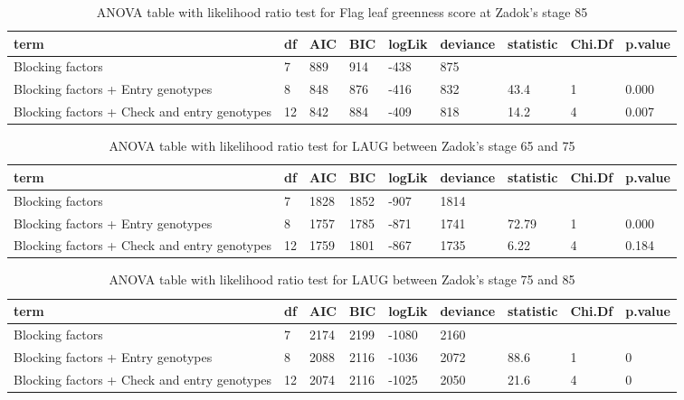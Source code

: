 \documentclass[12pt,oneside]{dukestatscithesis} %
\theoremstyle{definition}
\theoremstyle{definition}
\theoremstyle{definition}
\theoremstyle{remark}
\begin{document}
\begin{table}[H]
\begin{tabular}[t]{>{\raggedright\arraybackslash}p{3.5cm}llllllll}
\bottomrule
\end{tabular}
\end{table}\begin{table}[H]
\caption{\label{tab:unnamed-chunk-4}\label{tab:lrt-greenness3}ANOVA table with likelihood ratio test for Flag leaf greenness score at Zadok's stage 85}
\centering
\begin{tabular}[t]{>{\raggedright\arraybackslash}p{3.5cm}llllllll}
\toprule
term & df & AIC & BIC & logLik & deviance & statistic & Chi.Df & p.value\\
\midrule
Blocking factors & 7 & 889 & 914 & -438 & 875 &  &  & \\
Blocking factors + Entry genotypes & 8 & 848 & 876 & -416 & 832 & 43.4 & 1 & 0.000\\
Blocking factors + Check and entry genotypes & 12 & 842 & 884 & -409 & 818 & 14.2 & 4 & 0.007\\
\bottomrule
\end{tabular}
\end{table}\begin{table}[H]
\caption{\label{tab:unnamed-chunk-4}\label{tab:lrt-laug1}ANOVA table with likelihood ratio test for LAUG between Zadok's stage 65 and 75}
\centering
\begin{tabular}[t]{>{\raggedright\arraybackslash}p{3.5cm}llllllll}
\toprule
term & df & AIC & BIC & logLik & deviance & statistic & Chi.Df & p.value\\
\midrule
Blocking factors & 7 & 1828 & 1852 & -907 & 1814 &  &  & \\
Blocking factors + Entry genotypes & 8 & 1757 & 1785 & -871 & 1741 & 72.79 & 1 & 0.000\\
Blocking factors + Check and entry genotypes & 12 & 1759 & 1801 & -867 & 1735 & 6.22 & 4 & 0.184\\
\bottomrule
\end{tabular}
\end{table}\begin{table}[H]
\caption{\label{tab:unnamed-chunk-4}\label{tab:lrt-laug2}ANOVA table with likelihood ratio test for LAUG between Zadok's stage 75 and 85}
\centering
\begin{tabular}[t]{>{\raggedright\arraybackslash}p{3.5cm}llllllll}
\toprule
term & df & AIC & BIC & logLik & deviance & statistic & Chi.Df & p.value\\
\midrule
Blocking factors & 7 & 2174 & 2199 & -1080 & 2160 &  &  & \\
Blocking factors + Entry genotypes & 8 & 2088 & 2116 & -1036 & 2072 & 88.6 & 1 & 0\\
Blocking factors + Check and entry genotypes & 12 & 2074 & 2116 & -1025 & 2050 & 21.6 & 4 & 0\\
\bottomrule
\end{tabular}
\end{table}
\end{document}
